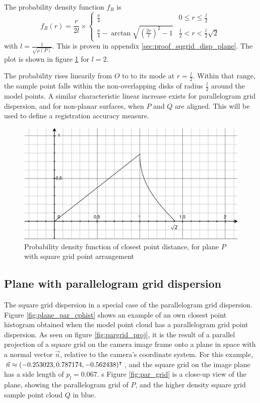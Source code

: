 The probability density function $f_R$ is
\begin{equation}
f_R(r) = \frac{r}{2 l} \times \begin{cases}
	\frac{\pi}{4} & 0 \leq r \leq \frac{l}{2} \\
	\frac{\pi}{4} - \arctan{\sqrt{\left( \frac{2r}{l} \right)^2 - 1}} & \frac{l}{2} < r < \frac{l}{2} \sqrt{2}
\end{cases}
\end{equation}
with $l = \frac{1}{\sqrt{\rho(P)}}$. This is proven in appendix \ref{sec:proof_sqgrid_disp_plane}. The plot is shown in figure \ref{fig:sq_grid_d} for $l = 2$.

The probability rises linearily from $O$ to to its mode at $r = \frac{l}{2}$. Within that range, the sample point falls within the non-overlapping disks of radius $\frac{l}{2}$ around the model points. A similar characteristic linear increase exists for parallelogram grid dispersion, and for non-planar surfaces, when $P$ and $Q$ are aligned. This will be used to define a registration accuracy measure.

\begin{figure}[p]
\centering
\includegraphics[width=.5\textwidth]{fig/sq_grid_d.pdf}
\caption{Probability density function of closest point distance, for plane $P$ with square grid point arrangement}
\label{fig:sq_grid_d}
\end{figure}


\subsection{Plane with parallelogram grid dispersion}
The square grid dispersion in a special case of the parallelogram grid dispersion. Figure \ref{fig:plane_par_cphist} shows an example of an own closest point histogram obtained when the model point cloud has a parallelogram grid point dispersion. As seen on figure \ref{fig:pargrid_proj}, it is the result of a parallel projection of a square grid on the camera image frame onto a plane in space with a normal vector $\vec{n}$, relative to the camera's coordinate system. For this example, $\vec{n} \approx (-0.253023, 0.787174, -0.562438)^\intercal$, and the square grid on the image plane has a side length of $p_l = 0.067$.
s
Figure \ref{fig:par_grid} is a close-up view of the plane, showing the parallelogram grid of $P$, and the higher density square grid sample point cloud $Q$ in blue.


